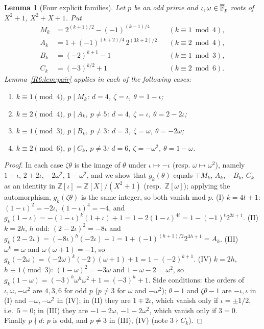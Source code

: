 \documentclass[11pt]{amsart}
\newtheorem{lemma}[theorem]{Lemma}
\theoremstyle{definition}
\theoremstyle{remark}
\providecommand{\Z}{\mathbb Z}
\begin{document}
\begin{lemma}[Four explicit families]\label{R6:lem:families}
Let $p$ be an odd prime and $\iota,\omega\in\overline{\mathbb{F}}_p$ roots of $X^2+1$, $X^2+X+1$. Put
\begin{align*}
M_k&=2^{(k+1)/2}-(-1)^{(k-1)/4} &&(k\equiv1\bmod4),\\
A_k&=1+(-1)^{(k+2)/4}\,2^{(3k+2)/2} &&(k\equiv2\bmod4),\\
B_k&=(-2)^{k+1}-1 &&(k\equiv1\bmod3),\\
C_k&=(-3)^{k/2}+1 &&(k\equiv2\bmod6).
\end{align*}
Lemma~\ref{R6:lem:pair} applies in each of the following cases:
\begin{enumerate}
\item[(I)] $k\equiv1\pmod4$, $p\mid M_k$: $d=4$, $\zeta=\iota$, $\theta=1-\iota$;
\item[(II)] $k\equiv2\pmod4$, $p\mid A_k$, $p\ne5$: $d=4$, $\zeta=\iota$, $\theta=2-2\iota$;
\item[(III)] $k\equiv1\pmod3$, $p\mid B_k$, $p\ne3$: $d=3$, $\zeta=\omega$, $\theta=-2\omega$;
\item[(IV)] $k\equiv2\pmod6$, $p\mid C_k$, $p\ne3$: $d=6$, $\zeta=-\omega^2$, $\theta=1-\omega$.
\end{enumerate}
\end{lemma}
\begin{proof}
In each case $\zeta\theta$ is the image of $\theta$ under $\iota\mapsto-\iota$ (resp.
$\omega\mapsto\omega^2$), namely $1+\iota$, $2+2\iota$, $-2\omega^2$, $1-\omega^2$, and we show that
$g_k(\theta)$ equals $\mp M_k$, $A_k$, $-B_k$, $C_k$ as an identity in $\Z[\iota]=\Z[X]/(X^2+1)$
(resp.\ $\Z[\omega]$); applying the automorphism, $g_k(\zeta\theta)$ is the same integer, so both
vanish mod $p$.
(I) $k=4t+1$: $(1-\iota)^2=-2\iota$, $(1-\iota)^4=-4$, and
$g_k(1-\iota)=-(1-\iota)^{k}(1+\iota)+1=1-2(1-\iota)^{4t}=1-(-1)^t2^{2t+1}$.
(II) $k=2h$, $h$ odd: $(2-2\iota)^2=-8\iota$ and
$g_k(2-2\iota)=(-8\iota)^h(-2\iota)+1=1+(-1)^{(h+1)/2}2^{3h+1}=A_k$.
(III) $\omega^k=\omega$ and $\omega(\omega+1)=-1$, so
$g_k(-2\omega)=(-2\omega)^k(-2)(\omega+1)+1=1-(-2)^{k+1}$.
(IV) $k=2h$, $h\equiv1\pmod3$: $(1-\omega)^2=-3\omega$ and $1-\omega-2=\omega^2$, so
$g_k(1-\omega)=(-3)^h\omega^h\omega^2+1=(-3)^h+1$.
Side conditions: the orders of $\iota,\omega,-\omega^2$ are $4,3,6$ for odd $p$ ($p\ne3$ for $\omega$ and $-\omega^2$); $\theta-1$ and
$\zeta\theta-1$ are $-\iota,\iota$ in (I) and $-\omega,-\omega^2$ in (IV); in (II) they are
$1\mp2\iota$, which vanish only if $\iota=\pm1/2$, i.e.\ $5=0$; in (III) they are $-1-2\omega$,
$-1-2\omega^2$, which vanish only if $3=0$. Finally $p\nmid d$: $p$ is odd, and $p\ne3$ in (III),
(IV) (note $3\nmid C_k$).
\end{proof}
\end{document}
